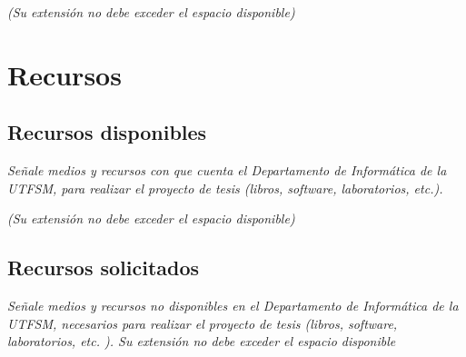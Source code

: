 \documentclass[11pt,spanish]{article}
\begin{document}
\emph{(Su extensión no debe exceder el espacio disponible)}

 
 
 

 

\section{Recursos}

\subsection{Recursos disponibles}

\emph{Señale medios y recursos con que cuenta el Departamento de Informática de
la UTFSM, para realizar el proyecto de tesis (libros, software, laboratorios,
etc.).}

\emph{(Su extensión no debe exceder el espacio disponible) }

\subsection{Recursos solicitados}

\emph{Señale medios y recursos no disponibles en el Departamento de Informática
de la UTFSM, necesarios para realizar el proyecto de tesis (libros, software,
laboratorios, etc. ). Su extensión no debe exceder el espacio disponible}
\end{document}
